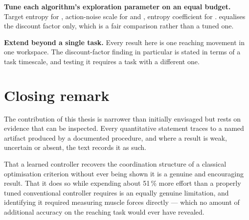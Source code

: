 \textbf{Tune each algorithm's exploration parameter on an equal budget.} Target
entropy for \SAC, action-noise scale for \TDIII and \DDPG, entropy coefficient
for \PPO.  equalises the discount factor only, which is a
fair comparison rather than a tuned one.

\textbf{Extend beyond a single task.} Every result here is one reaching movement
in one workspace. The discount-factor finding in particular is stated in terms of
a task timescale, and testing it requires a task with a different one.

\section{Closing remark}

The contribution of this thesis is narrower than initially envisaged but rests on
evidence that can be inspected. Every quantitative statement traces to a named
artifact produced by a documented procedure, and where a result is weak,
uncertain or absent, the text records it as such.

That a learned controller recovers the coordination structure of a classical
optimisation criterion without ever being shown it is a genuine and encouraging
result. That it does so while expending about 51\,\% more effort than a properly
tuned conventional controller requires is an equally genuine limitation, and identifying it required measuring muscle forces
directly --- which no amount of additional accuracy on the reaching task would ever
have revealed.
